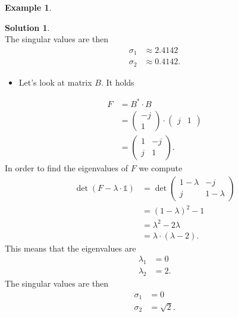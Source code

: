 \documentclass[a4paper,12 pt]{article}
\numberwithin{equation}{section}
\theoremstyle{definition}
\newtheorem{bsp}{Example}
\theoremstyle{remark}
\theoremstyle{definition}
\newtheorem*{lsg}{Solution}
\theoremstyle{definition}
\theoremstyle{definition}
\theoremstyle{remark}
\begin{document}
\begin{bsp}
\begin{lsg}
\begin{equation*}
\end{equation*}
The singular values are then
\begin{equation*}
\begin{split}
\sigma_1 &\approx 2.4142\\
\sigma_2 &\approx  0.4142.
\end{split}
\end{equation*}
\begin{itemize}
\item Let's look at matrix $B$. It holds
\end{itemize}
\begin{equation*}
\begin{split}
F&=B^*\cdot B\\
&=\begin{pmatrix}
-j\\
1
\end{pmatrix}\cdot \begin{pmatrix}
 j&1
 \end{pmatrix}\\
 &=\begin{pmatrix}
1&-j\\
j&1
\end{pmatrix}.
\end{split}
\end{equation*}
In order to find the eigenvalues of $F$ we compute
\begin{equation*}
\begin{split}
\det(F-\lambda \cdot \mathbb{1})&=\det \begin{pmatrix}
 1-\lambda &-j\\
j&1-\lambda
\end{pmatrix}\\
&=(1-\lambda)^2-1\\
&=\lambda^2-2\lambda\\
&=\lambda \cdot (\lambda -2).
\end{split}
\end{equation*}
This means that the eigenvalues are
\begin{equation*}
\begin{split}
\lambda_1 &=0\\
\lambda_2 &=2.
\end{split}
\end{equation*}
The singular values are then
\begin{equation*}
\begin{split}
\sigma_1 &= 0\\
\sigma_2 &=  \sqrt{2}.
\end{split}
\end{equation*}
\end{lsg}

\end{bsp}
\newpage
\end{document}
